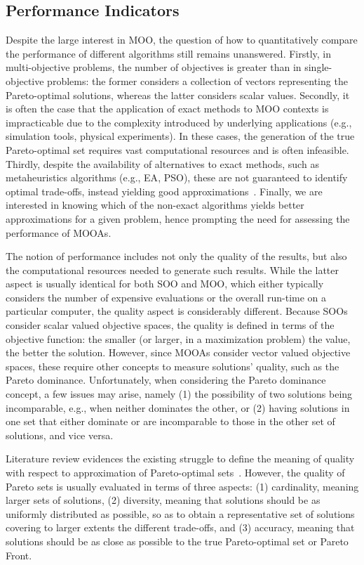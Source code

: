 	\subsection{Performance Indicators}
	\label{ssec:performance}
	Despite the large interest in \ac{MOO}, the question of how to quantitatively compare the performance of different algorithms still remains unanswered. Firstly, in multi-objective problems, the number of objectives is greater than in single-objective problems: the former considers a collection of vectors representing the Pareto-optimal solutions, whereas the latter considers scalar values. Secondly, it is often the case that the application of exact methods to \ac{MOO} contexts is impracticable due to the complexity introduced by underlying applications (e.g., simulation tools, physical experiments). In these cases, the generation of the true Pareto-optimal set requires vast computational resources and is often infeasible. Thirdly, despite the availability of alternatives to exact methods, such as metaheuristics algorithms (e.g., \ac{EA}, \ac{PSO}), these are not guaranteed to identify optimal trade-offs, instead yielding good approximations~\cite{Zitzler2003Metrics}. Finally, we are interested in knowing which of the non-exact algorithms yields better approximations for a given problem, hence prompting the need for assessing the performance of \acp{MOOA}.
	
	The notion of performance includes not only the quality of the results, but also the computational resources needed to generate such results. While the latter aspect is usually identical for both \ac{SOO} and \ac{MOO}, which either typically considers the number of expensive evaluations or the overall run-time on a particular computer, the quality aspect is considerably different. Because \acp{SOO} consider scalar valued objective spaces, the quality is defined in terms of the objective function: the smaller (or larger, in a maximization problem) the value, the better the solution. However, since \acp{MOOA} consider vector valued objective spaces, these require other concepts to measure solutions' quality, such as the Pareto dominance. Unfortunately, when considering the Pareto dominance concept, a few issues may arise, namely (1) the possibility of two solutions being incomparable, e.g., when neither dominates the other, or (2) having solutions in one set that either dominate or are incomparable to those in the other set of solutions, and vice versa. 
	
	Literature review evidences the existing struggle to define the meaning of quality with respect to approximation of Pareto-optimal sets~\cite{Knowles2002Metrics,Riquelme2015}. However, the quality of Pareto sets is usually evaluated in terms of three aspects: (1) cardinality, meaning larger sets of solutions, (2) diversity, meaning that solutions should be as uniformly distributed as possible, so as to obtain a representative set of solutions covering to larger extents the different trade-offs, and (3) accuracy, meaning that solutions should be as close as possible to the true Pareto-optimal set or Pareto Front. 
	
